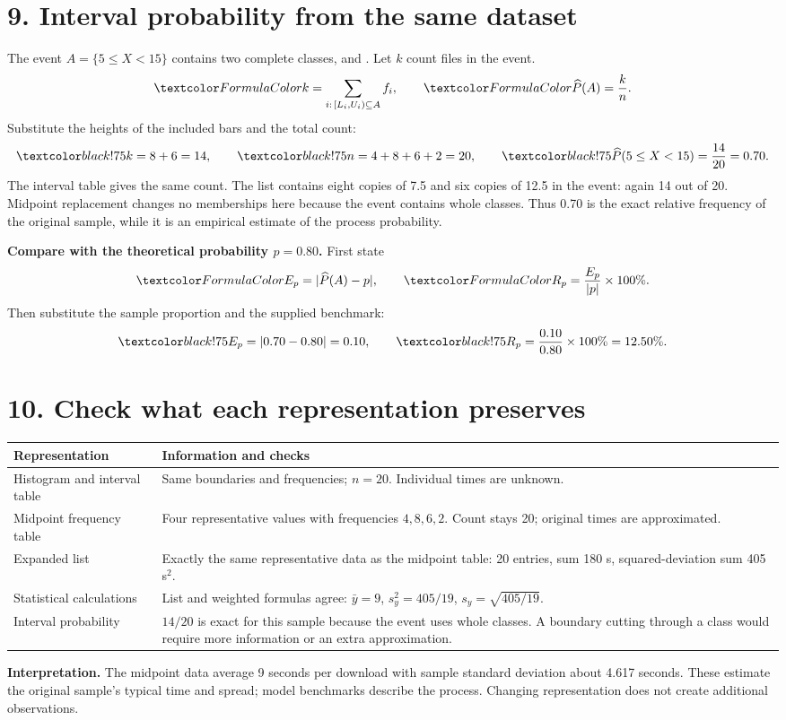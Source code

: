 \section*{9. Interval probability from the same dataset}
The event $A=\{5\le X<15\}$ contains two complete classes,
\iv{$[5,10)$} and \iv{$[10,15)$}. Let $k$ count files in the event.
\[
\fm{k=\sum_{i:\,[L_i,U_i)\subseteq A}f_i},\qquad
\fm{\widehat P(A)=\frac{k}{n}}.
\]
Substitute the heights of the included bars and the total count:
\[
\su{k=8+6=14},\qquad\su{n=4+8+6+2=20},\qquad
\su{\widehat P(5\le X<15)=\frac{14}{20}=0.70}.
\]
The interval table gives the same count. The list contains eight copies of 7.5
and six copies of 12.5 in the event: again 14 out of 20. Midpoint replacement
changes no memberships here because the event contains whole classes.
Thus 0.70 is the exact relative frequency of the original sample, while it is
an empirical estimate of the process probability.

\textbf{Compare with the theoretical probability $p=0.80$.} First state
\[
\fm{E_p=|\widehat P(A)-p|},\qquad
\fm{R_p=\frac{E_p}{|p|}\times100\%}.
\]
Then substitute the sample proportion and the supplied benchmark:
\[
\su{E_p=|0.70-0.80|=0.10},\qquad
\su{R_p=\frac{0.10}{0.80}\times100\%=12.50\%}.
\]
\section*{10. Check what each representation preserves}
\begin{center}
\begin{tabularx}{\textwidth}{|C{3.7cm}|X|}\hline
Representation&Information and checks\\\hline
Histogram and interval table&Same boundaries and frequencies; $n=20$.
Individual times are unknown.\\\hline
Midpoint frequency table&Four representative values with frequencies $4,8,6,2$.
Count stays 20; original times are approximated.\\\hline
Expanded list&Exactly the same representative data as the midpoint table:
20 entries, sum 180 s, squared-deviation sum 405 s$^2$.\\\hline
Statistical calculations&List and weighted formulas agree:
$\bar y=9$, $s_y^2=405/19$, $s_y=\sqrt{405/19}$.\\\hline
Interval probability&$14/20$ is exact for this sample because the event uses
whole classes. A boundary cutting through a class would require more information
or an extra approximation.\\\hline
\end{tabularx}
\end{center}
\textbf{Interpretation.} The midpoint data average 9 seconds per download with
sample standard deviation about 4.617 seconds. These estimate the original
sample's typical time and spread; model benchmarks describe the process.
Changing representation does not create additional observations.


